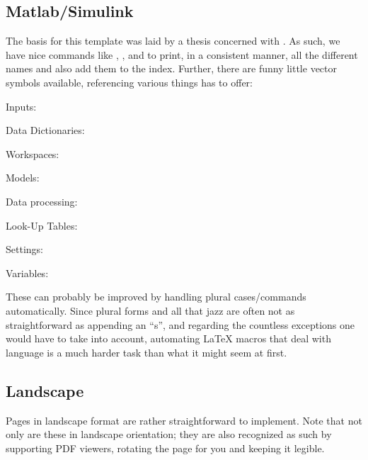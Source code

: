 \subsection{Matlab/Simulink}%
The basis for this template was laid by a thesis concerned with \mtlbsmlnk{}.
As such, we have nice commands like \mtlb{}, \smlnk{}, \mtlbsmlnk{} and \mtlbsymb{} to print, in a consistent manner, all the different names and also add them to the index.
Further, there are funny little vector symbols available, referencing various things \mtlbsmlnk{} has to offer:
\begin{description}
	\item Inputs: \SimulinkStep{} \quad \SimulinkSteps{}
	\item Data Dictionaries: \SimulinkDD{} \quad \SimulinkDDs{}
	\item Workspaces: \SimulinkBaseWS{} \quad \SimulinkModelWS{} \quad \SimulinkModelWSs{}
	\item Models: \SimulinkModel{} \quad \SimulinkModels{} \quad \SimulinkRefM{} \quad \SimulinkRefMs{} \quad \SimulinkLibM{} \quad \SimulinkLibMs{} \quad \SimulinkLibrary{} \quad \SimulinkLibraries{}
	\item Data processing: \SimulinkLogData{}
	\item Look-Up Tables: \SimulinkLUT{} \quad \SimulinkLUTs{}
	\item Settings: \SimulinkConfiguration{}
	\item Variables:  \quad \MatlabStruct{} \quad \MatlabStructs{} \quad \MatlabTable{} \quad \MatlabTables{} \quad {} \quad {} \quad \SimulinkBus{} \quad \SimulinkBuses{}
\end{description}
These can probably be improved by handling plural cases/commands automatically.
Since plural forms and all that jazz are often not as straightforward as appending an \enquote{s}, and regarding the countless exceptions one would have to take into account, automating \LaTeX{} macros that deal with language is a much harder task than what it might seem at first.
\begin{landscape}
\section{Landscape}

Pages in landscape format are rather straightforward to implement.
Note that not only are these in landscape orientation; they are also recognized as such by supporting PDF viewers, rotating the page for you and keeping it legible.
\end{landscape}
